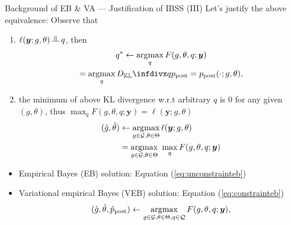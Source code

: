 \documentclass[10pt]{beamer}
\begin{document}
\begin{frame}{Background of EB \& VA --- \normalsize Justification of IBSS (III)}
    Let's justify the above equivalence: Observe that
    \begin{enumerate}
        \item $\ell(\bm{y};g,\theta)\vperp q$, then
        \begin{gather}
            q^* \gets \argmax_q F(g,\theta,q;\bm{y}) \\
            = \argmax_q \infdiv{q}{p_\text{post}}=p_\text{post}(\cdot;g,\theta),
        \end{gather} 

        \item the minimum of above KL divergence w.r.t arbitrary $q$ is 0 for any given $(g,\theta)$, thus $\max_{q} F(g,\theta,q;\bm{y}) = \ell(\bm{y};g,\theta)$
        \begin{align}
            (\hat{g},\hat{\theta}) 
            & \gets \operatorname*{\arg\!max}_{g\in\mathcal{G},\theta\in\Theta}\ell(\bm{y};g,\theta) \\
            & = \operatorname*{\arg\!max}_{g\in\mathcal{G},\theta\in\Theta}\ \max_{q} F(g,\theta,q;\bm{y})
        \end{align}
    \end{enumerate}

    \bigskip

    \begin{itemize}
        \item Empirical Bayes (EB) solution: Equation (\ref{eq:unconstrainteb})
        \item Variational empirical Bayes (VEB) solution: Equation (\ref{eq:constrainteb})
        \begin{gather}
            (\hat{g}, \hat{\theta},\hat{p}_{\text {post}})  \gets \operatorname*{\arg\!max}_{g \in \mathcal{G}, \theta \in \Theta, q\in\mathcal{Q}} F(g, \theta, q ; \bm{y}), \label{eq:constrainteb}
        \end{gather}
    \end{itemize}
\end{frame}


\end{document}

